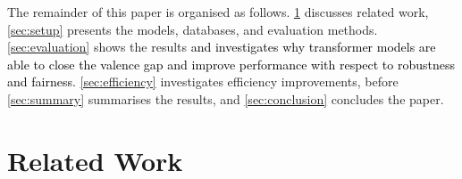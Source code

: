 \documentclass{article}
\newcommand{\review}[1]{\textcolor{black}{#1}}
\begin{document}
The remainder of this paper is organised as follows.
\cref{sec:related} discusses related work,
\cref{sec:setup} presents the models, databases, and evaluation methods.
\cref{sec:evaluation} shows the results 
\review{and investigates why transformer models are able to close the valence gap and improve performance with respect to robustness and fairness.}
\cref{sec:efficiency} investigates efficiency improvements,
before \cref{sec:summary} summarises the results,
and \cref{sec:conclusion} concludes the paper. 





\section{Related Work}
\label{sec:related}
\end{document}
